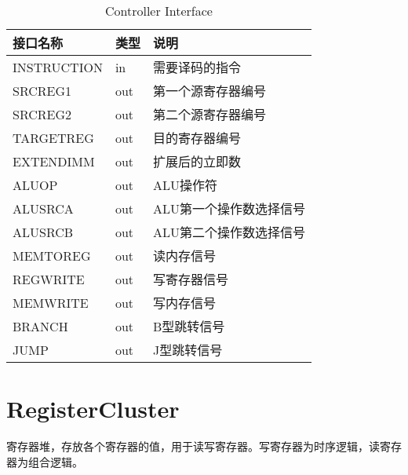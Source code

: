 \begin{center}
\renewcommand{\arraystretch}{1.3}
\small
\begin{longtable}{|p{3cm}<{\centering}|p{1.4cm}<{\centering}|p{7cm}<{\centering}|}
\caption{Controller Interface}
\label{tab:treatments}\\
\hline
接口名称 & 类型 & 说明 \\
\hline
INSTRUCTION & in & 需要译码的指令 \\
\hline
SRCREG1 & out & 第一个源寄存器编号 \\
\hline
SRCREG2 & out & 第二个源寄存器编号\\
\hline
TARGETREG & out & 目的寄存器编号 \\
\hline
EXTENDIMM & out & 扩展后的立即数 \\
\hline
ALUOP & out & ALU操作符 \\
\hline
ALUSRCA & out & ALU第一个操作数选择信号 \\
\hline
ALUSRCB & out & ALU第二个操作数选择信号 \\
\hline
MEMTOREG & out &  读内存信号 \\
\hline
REGWRITE & out & 写寄存器信号 \\
\hline
MEMWRITE & out & 写内存信号 \\
\hline
BRANCH & out & B型跳转信号 \\
\hline
JUMP & out & J型跳转信号 \\
\hline
\end{longtable}
\end{center}


\section{RegisterCluster}

寄存器堆，存放各个寄存器的值，用于读写寄存器。写寄存器为时序逻辑，读寄存器为组合逻辑。

